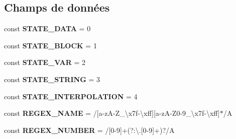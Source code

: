 \subsection*{Champs de données}
\begin{DoxyCompactItemize}
\item 
const {\bfseries S\+T\+A\+T\+E\+\_\+\+D\+A\+TA} = 0\hypertarget{class_twig___lexer_aed1034ab76d6f68a9936141fb43e46c4}{}\label{class_twig___lexer_aed1034ab76d6f68a9936141fb43e46c4}

\item 
const {\bfseries S\+T\+A\+T\+E\+\_\+\+B\+L\+O\+CK} = 1\hypertarget{class_twig___lexer_a7943cc4ef427db839acf8405ab7622b1}{}\label{class_twig___lexer_a7943cc4ef427db839acf8405ab7622b1}

\item 
const {\bfseries S\+T\+A\+T\+E\+\_\+\+V\+AR} = 2\hypertarget{class_twig___lexer_ace602c247a72e20792de0cbbaece8d4e}{}\label{class_twig___lexer_ace602c247a72e20792de0cbbaece8d4e}

\item 
const {\bfseries S\+T\+A\+T\+E\+\_\+\+S\+T\+R\+I\+NG} = 3\hypertarget{class_twig___lexer_aee10c9511fcc8204cd8ba7ced221e096}{}\label{class_twig___lexer_aee10c9511fcc8204cd8ba7ced221e096}

\item 
const {\bfseries S\+T\+A\+T\+E\+\_\+\+I\+N\+T\+E\+R\+P\+O\+L\+A\+T\+I\+ON} = 4\hypertarget{class_twig___lexer_ab366646ed1df9dc0a6b90e96dbaa2293}{}\label{class_twig___lexer_ab366646ed1df9dc0a6b90e96dbaa2293}

\item 
const {\bfseries R\+E\+G\+E\+X\+\_\+\+N\+A\+ME} = \textquotesingle{}/\mbox{[}a-\/zA-\/Z\+\_\+\textbackslash{}x7f-\/\textbackslash{}xff\mbox{]}\mbox{[}a-\/zA-\/Z0-\/9\+\_\+\textbackslash{}x7f-\/\textbackslash{}xff\mbox{]}$\ast$/\+A\textquotesingle{}\hypertarget{class_twig___lexer_a16ad69f49b3f1e3d15823ce6760c49c1}{}\label{class_twig___lexer_a16ad69f49b3f1e3d15823ce6760c49c1}

\item 
const {\bfseries R\+E\+G\+E\+X\+\_\+\+N\+U\+M\+B\+ER} = \textquotesingle{}/\mbox{[}0-\/9\mbox{]}+(?\+:\textbackslash{}.\mbox{[}0-\/9\mbox{]}+)?/A\textquotesingle{}\hypertarget{class_twig___lexer_aba3337b652ecdf16df6874ebc9307462}{}\label{class_twig___lexer_aba3337b652ecdf16df6874ebc9307462}


\end{DoxyCompactItemize}
